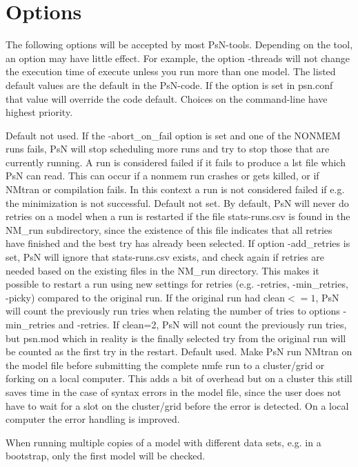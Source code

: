 \section{Options}
The following options will be accepted by most PsN-tools. Depending on the tool, an option may have little effect. For example, the option -threads will not change the execution time of execute unless you run more than one model. The listed default values are the default in the PsN-code. If the option is set in psn.conf that value will override the code default. Choices on the command-line have highest priority.
\begin{optionlist}
Default not used. If the -abort\_on\_fail option is set and one of the NONMEM runs fails, PsN will stop scheduling more runs and try to stop those that are currently running. A run is considered failed if it fails to produce a lst file which PsN can read. This can occur if a nonmem run crashes or gets killed, or if NMtran or compilation fails. 
In this context a run is not considered failed if e.g. the minimization is not successful.  
\nextopt
{}
Default not set. By default, PsN will never do retries on a model when a run is restarted if the file stats-runs.csv is found in the NM\_run subdirectory, since the existence of this file indicates that all retries have finished and the best try has already been selected. If option -add\_retries is set, PsN will ignore that stats-runs.csv exists, and check again if retries are needed based on the existing files in the NM\_run directory. This makes it possible to restart a run using new settings for retries (e.g. -retries, -min\_retries, -picky) compared to the original run. If the original run had clean$<=1$, PsN will count the previously run tries when relating the number of tries to options -min\_retries and -retries. If clean=2, PsN will not count the previously run tries, but psn.mod which in reality is the finally selected try from the original run will be counted as the first try in the restart.  
\nextopt
{}
Default used. Make PsN run NMtran on the model file before submitting the complete nmfe run to a cluster/grid or forking on a local computer. This adds a bit of overhead but on a cluster this still saves time in the case of syntax errors in the model file, since the user does not have to wait for a slot on the cluster/grid before the error is detected. On a local computer the error handling is improved.

When running multiple copies of a model with different data sets, e.g. in a bootstrap, only the first model will be checked. 


\end{optionlist}
